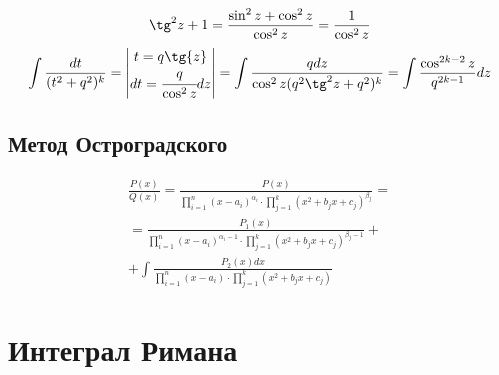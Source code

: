 \begin{comm}
    \[\tg^2z+1=\frac{\sin^2z+\cos^2z}{\cos^2z}=\frac{1}{\cos^2z}\]
    \[\int \frac{dt}{(t^2+q^2)^k}=\begin{vmatrix} t=q\tg{z}\\ dt=\cfrac{q}{\cos^2z}dz\end{vmatrix}=\int \frac{qdz}{\cos^2z(q^2\tg^2z+q^2)^k}=\int \frac{\cos^{2k-2}z}{q^{2k-1}}dz\]
\end{comm}
\subsection{Метод Остроградского}
\begin{multline*}
    \frac{P(x)}{Q(x)}=\frac{P(x)}{\prod\limits_{i=1}^{n}(x-a_i)^{\alpha_i}\cdot \prod\limits_{j=1}^{k}(x^2+b_j x+c_j)^{\beta_j}}=\\
    =\frac{P_1(x)}{\prod\limits_{i=1}^{n}(x-a_i)^{\alpha_i-1}\cdot \prod\limits_{j=1}^{k}(x^2+b_j x+c_j)^{\beta_j-1}}+\\
    +\int \frac{P_2(x)dx}{\prod\limits_{i=1}^{n}(x-a_i)\cdot \prod\limits_{j=1}^{k}(x^2+b_j x+c_j)}
\end{multline*}
\section{Интеграл Римана}
